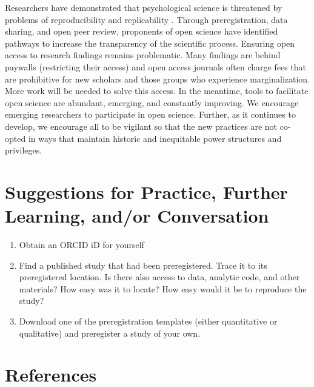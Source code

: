 \documentclass[
  11pt,
]{book}
\providecommand{\tightlist}{%
  \setlength{\itemsep}{0pt}\setlength{\parskip}{0pt}}
\begin{document}
Researchers have demonstrated that psychological science is threatened by problems of reproducibility and replicability \citep{open_science_collaboration_estimating_2015}. Through preregistration, data sharing, and open peer review, proponents of open science have identified pathways to increase the transparency of the scientific process. Ensuring open access to research findings remains problematic. Many findings are behind paywalls (restricting their access) and open access journals often charge fees that are prohibitive for new scholars and those groups who experience marginalization. More work will be needed to solve this access. In the meantime, tools to facilitate open science are abundant, emerging, and constantly improving. We encourage emerging researchers to participate in open science. Further, as it continues to develop, we encourage all to be vigilant so that the new practices are not co-opted in ways that maintain historic and inequitable power structures and privileges.

\hypertarget{suggestions-for-practice-further-learning-andor-conversation}{%
\section{Suggestions for Practice, Further Learning, and/or Conversation}\label{suggestions-for-practice-further-learning-andor-conversation}}

\begin{enumerate}
\def\labelenumi{\arabic{enumi}.}
\tightlist
\item
  Obtain an ORCID iD for yourself
\item
  Find a published study that had been preregistered. Trace it to its preregistered location. Is there also access to data, analytic code, and other materials? How easy was it to locate? How easy would it be to reproduce the study?
\item
  Download one of the preregistration templates (either quantitative or qualitative) and preregister a study of your own.
\end{enumerate}

\hypertarget{references}{%
\section{References}\label{references}}

  
\end{document}
